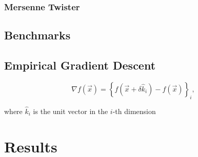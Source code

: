 \documentclass{article}
\begin{document}
            \subsubsection{Mersenne Twister}

        \subsection{Benchmarks}

        \subsection{Empirical Gradient Descent}

            \begin{equation}
                \nabla f(\vec{x}) = \left\{f\left(\vec{x} + \delta \hat{k}_i\right) - f\left(\vec{x}\right)\right\}_i,
            \end{equation}

            where $\hat{k}_i$ is the unit vector in the $i$-th dimension

    \section{Results}
\end{document}
